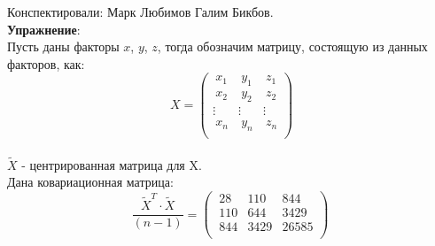 \documentclass[12pt]{article} %
\theoremstyle{definition} %
\begin{document}
Конспектировали: Марк Любимов Галим Бикбов.\\

\textbf{Упражнение}:\\
Пусть даны факторы $x$, $y$, $z$, тогда обозначим матрицу, состоящую из данных факторов, как:
\[
\ X = \begin{pmatrix}
           \ x_{1} & \ y_{1} &\ z_{1}\\
           \ x_{2} & \ y_{2} &\ z_{2}\\
           \vdots & \vdots &  \vdots\\
           \ x_{n} & \ y_{n} &\ z_{n}\\
         \end{pmatrix}
         \]\\
$\widetilde{X}$ - центрированная матрица для X.\\
Дана ковариационная матрица:
\[\frac{\widetilde{X}^T\cdot\widetilde{X}}{(n-1)} = \begin{pmatrix}
            \ 28 & 110 & 844\\
            \ 110 & 644 & 3429 \\
            \ 844 & 3429 & 26585\\
        \end{pmatrix}
\]
\end{document}
